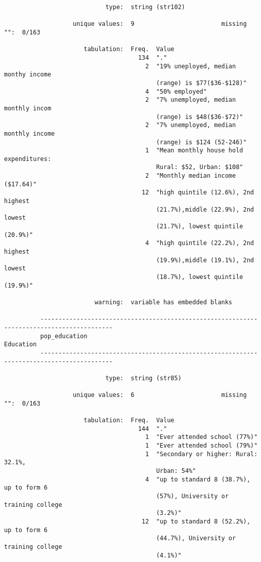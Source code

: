 \documentclass{article}
\begin{document}
\begin{verbatim}
                            type:  string (str102)
          
                   unique values:  9                        missing "":  0/163
          
                      tabulation:  Freq.  Value
                                     134  "."
                                       2  "19% uneployed, median monthy income
                                          (range) is $77($36-$128)"
                                       4  "50% employed"
                                       2  "7% unemployed, median monthly incom
                                          (range) is $48($36-$72)"
                                       2  "7% unemployed, median monthly income
                                          (range) is $124 (52-246)"
                                       1  "Mean monthly house hold expenditures:
                                          Rural: $52, Urban: $108"
                                       2  "Monthly median income ($17.64)"
                                      12  "high quintile (12.6%), 2nd highest
                                          (21.7%),middle (22.9%), 2nd lowest
                                          (21.7%), lowest quintile (20.9%)"
                                       4  "high quintile (22.2%), 2nd highest
                                          (19.9%),middle (19.1%), 2nd lowest
                                          (18.7%), lowest quintile (19.9%)"
          
                         warning:  variable has embedded blanks
          
          ------------------------------------------------------------------------------------------
          pop_education                                                                    Education
          ------------------------------------------------------------------------------------------
          
                            type:  string (str85)
          
                   unique values:  6                        missing "":  0/163
          
                      tabulation:  Freq.  Value
                                     144  "."
                                       1  "Ever attended school (77%)"
                                       1  "Ever attended school (79%)"
                                       1  "Secondary or higher: Rural: 32.1%,
                                          Urban: 54%"
                                       4  "up to standard 8 (38.7%), up to form 6
                                          (57%), University or training college
                                          (3.2%)"
                                      12  "up to standard 8 (52.2%), up to form 6
                                          (44.7%), University or training college
                                          (4.1%)"
          

\end{verbatim}
\end{document}
